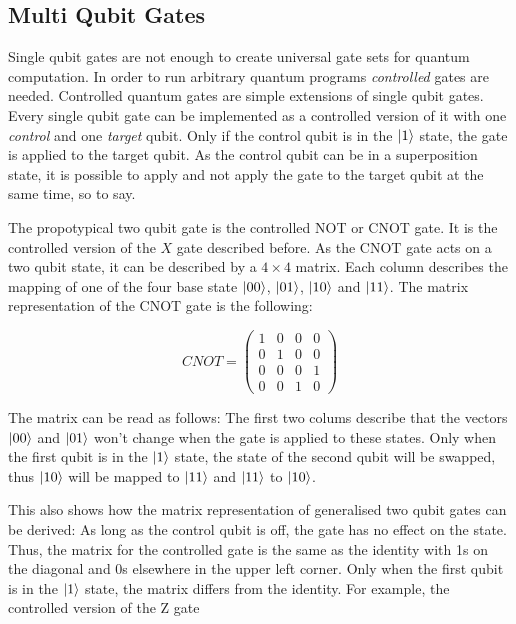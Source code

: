\subsection{Multi Qubit Gates}

Single qubit gates are not enough to create universal gate sets for quantum
computation. In order to run arbitrary quantum programs 
 \textit{controlled} gates are needed.
Controlled quantum gates are simple extensions of single qubit gates. Every single qubit gate can be implemented as a controlled 
version of it with one \textit{control} and one \textit{target} qubit. Only if
the control qubit is in the $\Ket{1}$ state, the gate is applied to the target
qubit. As the control qubit can be in a superposition state, it is possible 
to apply and not apply the gate to the target qubit at the same time, so
to say.

The propotypical two qubit gate is the controlled NOT or CNOT gate. It is the controlled version of the 
$X$ gate described before. As the CNOT gate acts on a two qubit state, it can be described by 
a $4 \times 4$ matrix. Each column describes the mapping of one of the four base
state $\Ket{00}$, $\Ket{01}$, $\Ket{10}$ and $\Ket{11}$. 
The matrix representation of the CNOT gate is the following:

\begin{equation}
  CNOT = \begin{pmatrix}
    1 & 0 & 0 & 0 \\
    0 & 1 & 0 & 0 \\
    0 & 0 & 0 & 1 \\
    0 & 0 & 1 & 0
    \end{pmatrix}
\end{equation}

The matrix can be read as follows: The first two colums describe that the vectors $\Ket{00}$ and $\Ket{01}$ won't change 
when the gate is applied to these states. Only when the first qubit is in the $\Ket{1}$ state, the state of the second qubit 
will be swapped, thus $\Ket{10}$ will be mapped to $\Ket{11}$ and $\Ket{11}$ to $\Ket{10}$. 

This also shows how the matrix representation of generalised two qubit gates can be derived: As long as the 
control qubit is off, the gate has no effect on the state. Thus, the matrix for
the controlled gate is the same as the identity with 1s on the 
diagonal and 0s elsewhere in the upper left corner. Only when the first qubit is in the $\Ket{1}$ state, the matrix differs from the identity. For example, the 
controlled version of the Z gate

